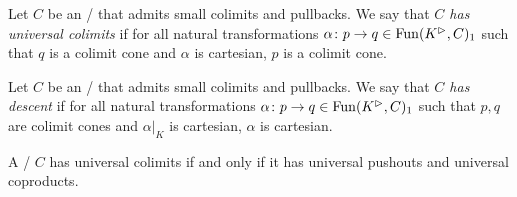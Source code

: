 \begin{definition}[Universality]
    Let $C$ be an \inftycat/ that admits small colimits and pullbacks.
    We say that \emph{$C$ has universal colimits} if for all natural transformations $\alpha\colon p\to q\in\operatorname{Fun}(K^{\rhd},C)_1$ such that $q$ is a  colimit cone and $\alpha$ is cartesian, $p$ is a colimit cone.
\end{definition}
\begin{definition}[Descent]
    Let $C$ be an \inftycat/ that admits small colimits and pullbacks.
    We say that \emph{$C$ has descent} if for all natural transformations $\alpha\colon p\to q\in\operatorname{Fun}(K^{\rhd},C)_1$ such that $p,q$ are colimit cones and $\alpha|_K$ is cartesian, $\alpha$ is cartesian.
\end{definition}
\begin{lemma}
    A \inftycat/ $C$ has universal colimits if and only if it has universal pushouts and universal coproducts.
\end{lemma}
